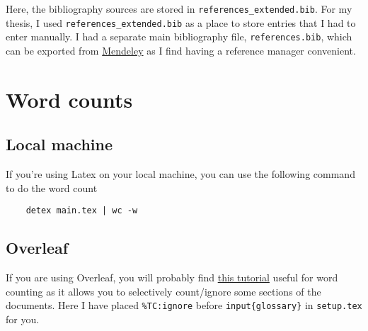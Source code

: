 Here, the bibliography sources are stored in \texttt{references\_extended.bib}. For my thesis, I used \texttt{references\_extended.bib} as a place to store entries that I had to enter manually. I had a separate main bibliography file, \texttt{references.bib}, which can be exported from \href{https://www.mendeley.com/?interaction_required=true}{Mendeley} as I find having a reference manager convenient.

\section{Word counts}

\subsection*{Local machine}
If you're using Latex on your local machine, you can use the following command to do the word count

\begin{verbatim}
    detex main.tex | wc -w
\end{verbatim}

\subsection*{Overleaf}
If you are using Overleaf, you will probably find \href{https://www.overleaf.com/learn/how-to/Is_there_a_way_to_run_a_word_count_that_doesn\%27t_include_LaTeX_commands\%3F}{this tutorial} useful for word counting as it allows you to selectively count/ignore some sections of the documents. Here I have placed \texttt{\%TC:ignore} before \texttt{input\{glossary\}} in \texttt{setup.tex} for you.